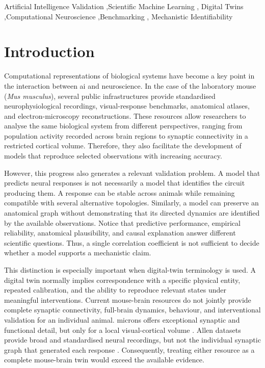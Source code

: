 \documentclass[a4paper,fleqn]{cas-sc}
\begin{document}
\begin{keywords}
Artificial Intelligence Validation \sep Scientific Machine Learning \sep
Digital Twins \sep Computational Neuroscience \sep Benchmarking \sep
Mechanistic Identifiability
\end{keywords}


\maketitle
\acresetall


\section{Introduction}
\label{sec:introduction}

Computational representations of biological systems have become a key point in
the interaction between \ac{ai} and neuroscience. In the case of the laboratory
mouse (\textit{Mus musculus}), several public infrastructures provide standardised
neurophysiological recordings, visual-response benchmarks, anatomical atlases,
and electron-microscopy reconstructions. These resources allow researchers to
analyse the same biological system from different perspectives, ranging from
population activity recorded across brain regions to synaptic connectivity in a
restricted cortical volume. Therefore, they also facilitate the development of
models that reproduce selected observations with increasing accuracy.

However, this progress also generates a relevant validation problem. A model
that predicts neural responses is not necessarily a model that identifies the
circuit producing them. A response can be stable across animals while remaining
compatible with several alternative topologies. Similarly, a model can preserve
an anatomical graph without demonstrating that its directed dynamics are
identified by the available observations. Notice that predictive performance,
empirical reliability, anatomical plausibility, and causal explanation answer
different scientific questions. Thus, a single correlation coefficient is not
sufficient to decide whether a model supports a mechanistic claim.

This distinction is especially important when digital-twin terminology is used.
A digital twin normally implies correspondence with a specific physical entity,
repeated calibration, and the ability to reproduce relevant states under
meaningful interventions. Current mouse-brain resources do not jointly provide
complete synaptic connectivity, full-brain dynamics, behaviour, and
interventional validation for an individual animal. \ac{microns} offers
exceptional synaptic and functional detail, but only for a local visual-cortical
volume \citep{bae2025microns}. Allen datasets provide broad and standardised
neural recordings, but not the individual synaptic graph that generated each
response \citep{siegle2021survey}. Consequently,
treating either resource as a complete mouse-brain twin would exceed the
available evidence.
\end{document}
